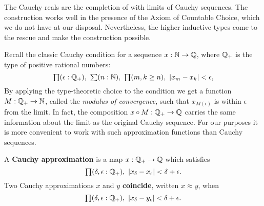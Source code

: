 The Cauchy reals are the completion of \Q with limits of Cauchy sequences. The
construction works well in the presence of the Axiom of Countable Choice, which we do not
have at our disposal. Nevertheless, the higher inductive types come to the rescue and make
the construction possible.

Recall the classic Cauchy condition for a sequence $x : \mathbb{N} \to \mathbb{Q}$, where $\mathbb{Q}_{+}$ is the
type of positive rational numbers:
%
\[ \prd{\epsilon : \Qp} \sm{n : \N} \prd{m, k \geq n} |x_m - x_k| < \epsilon, \]
%
By applying the type-theoretic choice to the condition we get a function $M : \mathbb{Q}_{+} \to \mathbb{N}$,
called the \emph{modulus of convergence}, such that $x_{M(\epsilon)}$ is within $\epsilon$
from the limit. In fact, the composition $x \circ M : \mathbb{Q}_{+} \to \mathbb{Q}$ carries the same
information about the limit as the original Cauchy sequence. For our purposes it is more
convenient to work with such approximation functions than Cauchy sequences.

\begin{defn}\label{defn:cauchy-approximation}
  A \textbf{Cauchy approximation} is a map $x : \mathbb{Q}_{+} \to \mathbb{Q}$ which satisfies
  \begin{equation}
    \label{eq:cauchy-approx}
    \prd{\delta, \epsilon :\Qp} |x_\delta - x_\epsilon| < \delta + \epsilon.
  \end{equation}
  Two Cauchy approximations $x$ and $y$ \textbf{coincide}, written $x \approx y$, when
  \begin{equation}
    \label{eq:cauchy-coincide}
    \prd{\delta, \epsilon:\Qp} |x_\delta - y_\epsilon| < \delta + \epsilon.
  \end{equation}
\end{defn}

